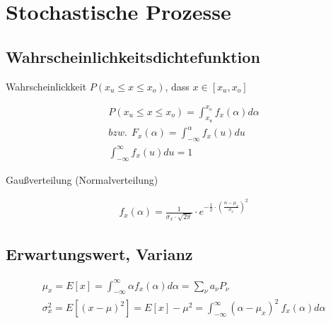 \documentclass[10pt,a4paper]{article}
\begin{document}
\section{Stochastische Prozesse}
\subsection{Wahrscheinlichkeitsdichtefunktion}
Wahrscheinlickkeit $P(x_u \leq x \leq x_o )$, dass $x \in [x_u,x_o]$ 
  \begin{mdframed}[style=exercise]
    \begin{align}
        P(x_u \leq x \leq x_o ) = \displaystyle\int_{x_u}^{x_o} f_x(\alpha) d\alpha \\
        bzw. \ \ F_x(\alpha) = \displaystyle\int_{-\infty}^{\alpha} f_x(u)du\\
        \displaystyle\int_{-\infty}^{\infty} f_x(u)du = 1
    \end{align}
  \end{mdframed}
Gaußverteilung (Normalverteilung)
  \begin{mdframed}[style=exercise]
    \begin{align}
        f_x(\alpha) = \frac{1}{\sigma_x \cdot \sqrt{2\pi}} \cdot e^{-\frac{1}{2} \cdot \left( \frac{\alpha - \mu_x}{\sigma_x}\right)^2}
    \end{align}
  \end{mdframed}
\subsection{Erwartungswert, Varianz}
  \begin{mdframed}[style=exercise]
    \begin{align}
        \mu_x = E[x] = \displaystyle\int_{-\infty}^{\infty} \alpha f_x(\alpha) d\alpha = \displaystyle\sum_{\nu}^{} a_\nu P_\nu\\
        \sigma_x^2 = E[(x-\mu)^2] = E[x]-\mu^2  = \displaystyle\int_{-\infty}^{\infty} (\alpha-\mu_x)^2 \ f_x(\alpha) d\alpha
    \end{align}
  \end{mdframed}
\end{document}
